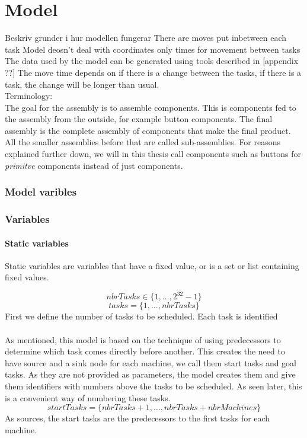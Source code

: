  \chapter{Model}
 
 Beskriv grunder i hur modellen fungerar
 There are moves put inbetween each task
 Model deosn't deal with coordinates only times for movement between tasks
 The data used by the model can be generated using tools described in [appendix ??]
 The move time depends on if there is a change between the tasks, if there is a task, the change will be longer than usual.
 \\Terminology:\\
 The goal for the assembly is to assemble components. This is components fed to the assembly from the outside, for example button components. The final assembly is the complete assembly of components that make the final product. All the smaller assemblies before that are called sub-assemblies. For reasons explained further down, we will in this thesis call components such as buttons for \emph{primitve} components instead of just components.
 \subsection{Model varibles}
 \subsection{Variables}
 \subsubsection{Static variables}
 Static variables are variables that have a fixed value, or is a set or list containing fixed values.
 
 \begin{equation}\label{eq:1}
 nbrTasks \in \{1 , \ldots , 2^{32}-1\}
 \end{equation}
 \begin{equation}\label{eq:10}
 tasks = \{1 , \ldots , nbrTasks\}
 \end{equation}
 First we define the number of tasks to be scheduled. Each task is identified 
 \\\\
 As mentioned, this model is based on the technique of using predecessors to determine which task comes directly before another. This creates the need to have source and a sink node for each machine, we call them start tasks and goal tasks. As they are not provided as parameters, the model creates them and give them identifiers with numbers above the tasks to be scheduled. As seen later, this is a convenient way of numbering these tasks.
 \begin{equation}\label{eq:19}
 startTasks = \{nbrTasks+1 , \ldots , nbrTasks+nbrMachines\}
 \end{equation}
 As sources, the start tasks are the predecessors to the first tasks for each machine.
 
